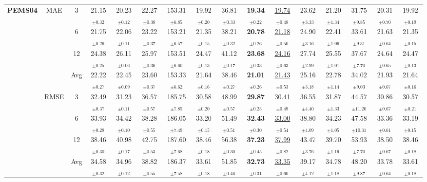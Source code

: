 \begin{table}[t]
{\begin{tabular}{ccc|ccc|cccc|cccc|cc}
\midrule
\multirow{12}{*}{\textbf{PEMS04}} & \multirow{4}{*}{MAE} & 3 & 21.15$_{\pm0.32}$ & 20.23$_{\pm0.12}$ & 22.27$_{\pm0.38}$ & 153.31$_{\pm6.85}$ & 19.92$_{\pm0.20}$ & 36.81$_{\pm0.33}$ & \textbf{19.34$_{\pm0.22}$} & \underline{19.74$_{\pm0.48}$} & 23.62$_{\pm3.33}$ & 21.20$_{\pm1.34}$ & 31.75$_{\pm9.85}$ & 20.31$_{\pm0.70}$ & 19.92$_{\pm0.19}$ \\
 &  & 6 & 21.75$_{\pm0.26}$ & 22.06$_{\pm0.11}$ & 23.22$_{\pm0.37}$ & 153.21$_{\pm6.57}$ & 21.35$_{\pm0.15}$ & 38.21$_{\pm0.32}$ & \textbf{20.78$_{\pm0.26}$} & \underline{21.18$_{\pm0.50}$} & 24.90$_{\pm3.16}$ & 22.41$_{\pm1.06}$ & 33.61$_{\pm9.31}$ & 21.63$_{\pm0.64}$ & 21.35$_{\pm0.15}$ \\
 &  & 12 & 24.38$_{\pm0.25}$ & 26.11$_{\pm0.06}$ & 25.97$_{\pm0.36}$ & 153.51$_{\pm6.60}$ & 24.47$_{\pm0.13}$ & 41.12$_{\pm0.17}$ & \textbf{23.68$_{\pm0.33}$} & \underline{24.16$_{\pm0.63}$} & 27.74$_{\pm2.99}$ & 25.55$_{\pm1.01}$ & 37.67$_{\pm7.70}$ & 24.64$_{\pm0.65}$ & 24.47$_{\pm0.13}$ \\
 &  & Avg & 22.22$_{\pm0.27}$ & 22.45$_{\pm0.09}$ & 23.60$_{\pm0.37}$ & 153.33$_{\pm6.62}$ & 21.64$_{\pm0.16}$ & 38.46$_{\pm0.27}$ & \textbf{21.01$_{\pm0.26}$} & \underline{21.43$_{\pm0.53}$} & 25.16$_{\pm3.18}$ & 22.78$_{\pm1.14}$ & 34.02$_{\pm9.03}$ & 21.93$_{\pm0.67}$ & 21.64$_{\pm0.16}$ \\
\cmidrule(lr){2-16}
 & \multirow{4}{*}{RMSE} & 3 & 32.49$_{\pm0.37}$ & 31.23$_{\pm0.11}$ & 36.57$_{\pm0.57}$ & 185.75$_{\pm7.85}$ & 30.58$_{\pm0.20}$ & 48.99$_{\pm0.57}$ & \textbf{29.87$_{\pm0.23}$} & \underline{30.41$_{\pm0.49}$} & 36.55$_{\pm4.40}$ & 31.87$_{\pm1.33}$ & 44.57$_{\pm11.20}$ & 30.86$_{\pm0.67}$ & 30.57$_{\pm0.21}$ \\
 &  & 6 & 33.93$_{\pm0.28}$ & 34.42$_{\pm0.10}$ & 38.28$_{\pm0.55}$ & 186.05$_{\pm7.49}$ & 33.20$_{\pm0.15}$ & 51.49$_{\pm0.51}$ & \textbf{32.43$_{\pm0.30}$} & \underline{33.00$_{\pm0.54}$} & 38.80$_{\pm4.09}$ & 34.23$_{\pm1.05}$ & 47.58$_{\pm10.31}$ & 33.36$_{\pm0.61}$ & 33.19$_{\pm0.15}$ \\
 &  & 12 & 38.46$_{\pm0.30}$ & 40.98$_{\pm0.17}$ & 42.75$_{\pm0.53}$ & 187.60$_{\pm7.68}$ & 38.46$_{\pm0.18}$ & 56.38$_{\pm0.30}$ & \textbf{37.23$_{\pm0.45}$} & \underline{37.99$_{\pm0.82}$} & 43.47$_{\pm3.76}$ & 39.70$_{\pm1.19}$ & 53.93$_{\pm7.70}$ & 38.50$_{\pm0.67}$ & 38.46$_{\pm0.18}$ \\
 &  & Avg & 34.58$_{\pm0.32}$ & 34.96$_{\pm0.12}$ & 38.82$_{\pm0.55}$ & 186.37$_{\pm7.58}$ & 33.61$_{\pm0.18}$ & 51.85$_{\pm0.46}$ & \textbf{32.73$_{\pm0.31}$} & \underline{33.35$_{\pm0.60}$} & 39.17$_{\pm4.12}$ & 34.78$_{\pm1.18}$ & 48.20$_{\pm9.87}$ & 33.78$_{\pm0.64}$ & 33.61$_{\pm0.18}$ \\

\end{tabular}}
\end{table}

